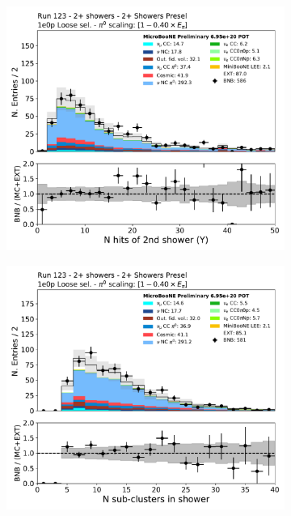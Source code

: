 \begin{figure}[H]
    \begin{center}
    \begin{subfigure}{0.4\textwidth}
    \includegraphics[width=1.00\textwidth]{Sidebands/Figures/TwoShr_1e0pSel_newSamples/secondshower_Y_nhit_loose.pdf}
    \end{subfigure}
    \begin{subfigure}{0.4\textwidth}
    \includegraphics[width=1.00\textwidth]{Sidebands/Figures/TwoShr_1e0pSel_newSamples/subcluster_loose.pdf}

\end{subfigure}
\end{center}
\end{figure}
